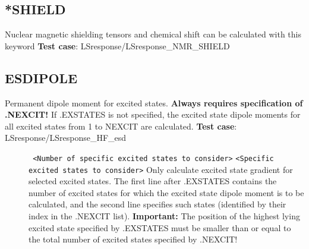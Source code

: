 \subsection{*SHIELD}\label{nmrshield}
Nuclear magnetic shielding tensors and chemical shift can be calculated with this keyword
{\bf Test case}: LSresponse/LSresponse\_NMR\_SHIELD

\subsection*{ESDIPOLE}\label{subsec:esd}
Permanent dipole moment for excited states. 
{\bf Always requires specification of .NEXCIT!}\newline
If .EXSTATES is not specified, the excited state dipole moments
for all excited states from 1 to NEXCIT
are calculated. \newline
{\bf Test case}: LSresponse/LSresponse\_HF\_esd
\begin{description}
\item[] \verb| | \newline
\verb|<Number of specific excited states to consider>|\newline
\verb|<Specific excited states to consider>|\newline
Only calculate excited state gradient for selected excited states.
The first line after .EXSTATES contains the number
of excited states for which the 
excited state dipole moment
is to be calculated,
and the second line specifies such states (identified by their 
index in the .NEXCIT list).
{\bf Important:} The position of the highest lying excited state
specified by .EXSTATES must be smaller than or equal to
the total number of excited states specified by .NEXCIT!
\end{description}

